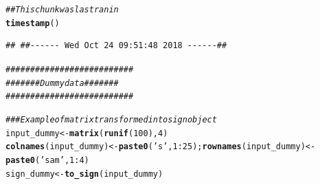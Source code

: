 \documentclass{article}\usepackage[]{graphicx}\usepackage[]{color}
\makeatletter
\newcommand{\hlnum}[1]{\textcolor[rgb]{0.686,0.059,0.569}{#1}}%
\newcommand{\hlstr}[1]{\textcolor[rgb]{0.192,0.494,0.8}{#1}}%
\newcommand{\hlcom}[1]{\textcolor[rgb]{0.678,0.584,0.686}{\textit{#1}}}%
\newcommand{\hlopt}[1]{\textcolor[rgb]{0,0,0}{#1}}%
\newcommand{\hlstd}[1]{\textcolor[rgb]{0.345,0.345,0.345}{#1}}%
\newcommand{\hlkwb}[1]{\textcolor[rgb]{0.69,0.353,0.396}{#1}}%
\newcommand{\hlkwd}[1]{\textcolor[rgb]{0.737,0.353,0.396}{\textbf{#1}}}%
\newenvironment{kframe}{%
 \def\at@end@of@kframe{}%
 \ifinner\ifhmode%
  \def\at@end@of@kframe{\end{minipage}}%
  \begin{minipage}{\columnwidth}%
 \fi\fi%
 \def\FrameCommand##1{\hskip\@totalleftmargin \hskip-\fboxsep
 \colorbox{shadecolor}{##1}\hskip-\fboxsep
     \hskip-\linewidth \hskip-\@totalleftmargin \hskip\columnwidth}%
 \MakeFramed {\advance\hsize-\width
   \@totalleftmargin\z@ \linewidth\hsize
   \@setminipage}}%
 {\par\unskip\endMakeFramed%
 \at@end@of@kframe}
\newenvironment{knitrout}{}{} %
\makeatother
\begin{document}
\begin{knitrout}
\color{fgcolor}\begin{kframe}
\begin{alltt}
\hlcom{## This chunk was last ran in}
\hlkwd{timestamp}\hlstd{()}
\end{alltt}
\begin{verbatim}
## ##------ Wed Oct 24 09:51:48 2018 ------##
\end{verbatim}
\begin{alltt}
\hlcom{##########################}
\hlcom{####### Dummy data #######}
\hlcom{##########################}

\hlcom{### Example of matrix transformed into sign object}
\hlstd{input_dummy} \hlkwb{<-} \hlkwd{matrix}\hlstd{(}\hlkwd{runif}\hlstd{(}\hlnum{100}\hlstd{),} \hlnum{4}\hlstd{)}
\hlkwd{colnames}\hlstd{(input_dummy)} \hlkwb{<-} \hlkwd{paste0}\hlstd{(}\hlstr{'s'}\hlstd{,} \hlnum{1}\hlopt{:}\hlnum{25}\hlstd{);} \hlkwd{rownames}\hlstd{(input_dummy)} \hlkwb{<-} \hlkwd{paste0}\hlstd{(}\hlstr{'sam'}\hlstd{,} \hlnum{1}\hlopt{:}\hlnum{4}\hlstd{)}
\hlstd{sign_dummy} \hlkwb{<-} \hlkwd{to_sign}\hlstd{(input_dummy)}
\end{alltt}
\end{kframe}
\end{knitrout}
\end{document}
